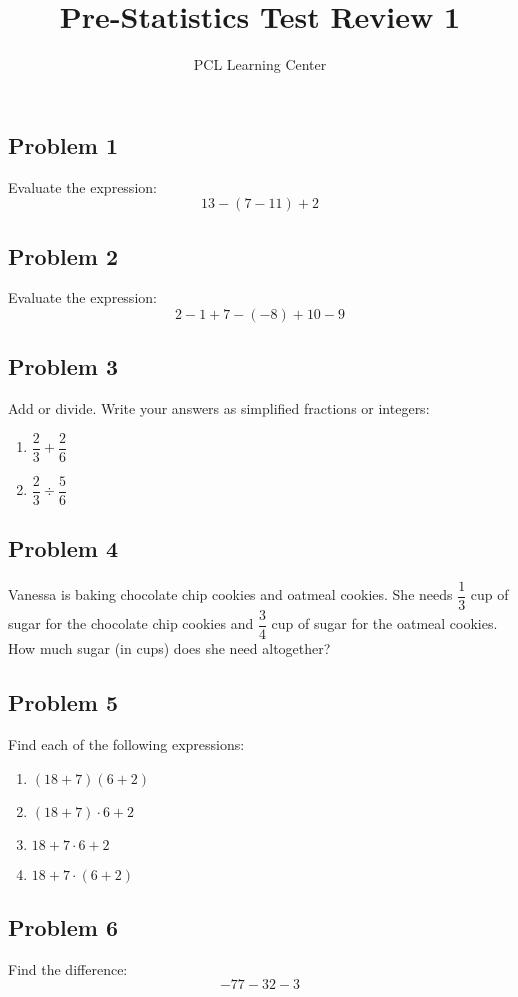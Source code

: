 \documentclass[12pt]{article}
\title{Pre-Statistics Test Review 1}
\author{PCL Learning Center}
\date{}
\begin{document}
\maketitle

\subsection*{Problem 1}
Evaluate the expression:  
\[
13 - (7 - 11) + 2
\]

\subsection*{Problem 2}
Evaluate the expression:  
\[
2 - 1 + 7 - (-8) + 10 - 9
\]

\subsection*{Problem 3}
Add or divide. Write your answers as simplified fractions or integers:
\begin{enumerate}[label=\alph*)]
  \item \(\dfrac{2}{3} + \dfrac{2}{6}\)
  \item \(\dfrac{2}{3} \div \dfrac{5}{6}\)
\end{enumerate}

\subsection*{Problem 4}
Vanessa is baking chocolate chip cookies and oatmeal cookies.  
She needs \(\dfrac{1}{3}\) cup of sugar for the chocolate chip cookies and \(\dfrac{3}{4}\) cup of sugar for the oatmeal cookies.  
How much sugar (in cups) does she need altogether?

\subsection*{Problem 5}
Find each of the following expressions:
\begin{enumerate}[label=\alph*)]
  \item \((18 + 7)(6 + 2)\)
  \item \((18 + 7) \cdot 6 + 2\)
  \item \(18 + 7 \cdot 6 + 2\)
  \item \(18 + 7 \cdot (6 + 2)\)
\end{enumerate}

\subsection*{Problem 6}
Find the difference:  
\[
-77 - 32 - 3
\]
\end{document}
